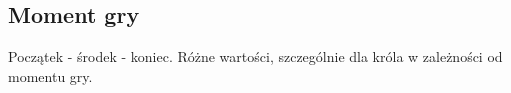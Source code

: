 \subsection{Moment gry}
\label{subsec:moment-gry}

{
    \color{red}
    \large Początek - środek - koniec.
    Różne wartości, szczególnie dla króla w zależności od momentu gry.
}